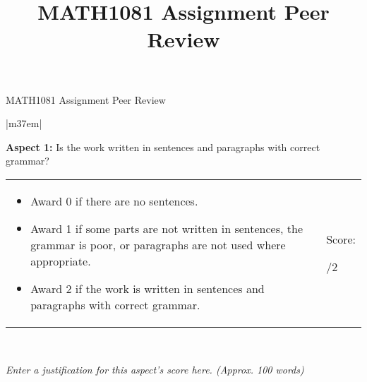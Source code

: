 \documentclass[article,11pt]{book}
\title{MATH1081 Assignment Peer Review}
\author{}
\date{}
\begin{document}
{\huge MATH1081 Assignment Peer Review} 

\bigskip


\begin{tabular}{|m{37em}|}
    \hline
    
    \textbf{Aspect 1:} Is the work written in sentences and paragraphs with correct grammar? 
    \\ \hline
    
    \begin{tabular}{m{32em}|m{5em}}
      \begin{itemize}
          \item Award 0 if there are no sentences.
          \item Award 1 if some parts are not written in sentences, the grammar is poor, or paragraphs are not used where appropriate.
          \item Award 2 if the work is written in sentences and paragraphs with correct grammar.
      \end{itemize}  
      &  
      Score: 
      
      \medskip
      {\huge  /2}
    \end{tabular} 
    \\ \hline
    
    \textit{Enter a justification for this aspect’s score here. (Approx. 100 words)}
    \\ \hline
\end{tabular}

\bigskip

\end{document}
